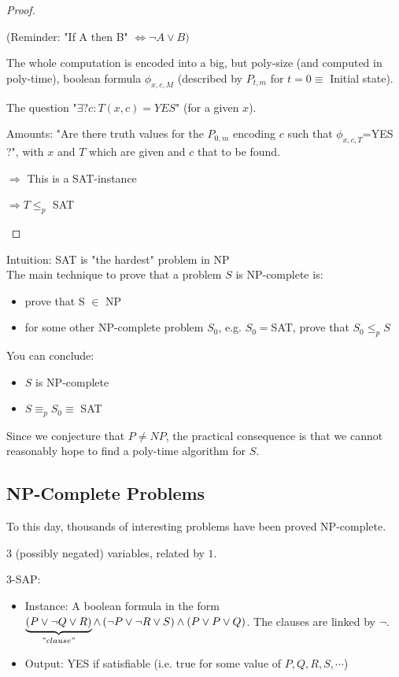 \begin{proof}
\begin{itemize}
(Reminder: "If A then B" $\Leftrightarrow \neg A \vee B)$ 

The whole computation is encoded into a big, but poly-size (and computed in poly-time), boolean formula $\phi_{x,c,M}$ (described by $P_{t,m}$ for $t=0\equiv$ Initial state). 

The question "$\exists ? c: T(x,c)=YES$" (for a given $x$). 

Amounts: "Are there truth values for the $P_{0,m}$ encoding $c$ such that $\phi_{x,c,T}$=YES ?", with $x$ and $T$ which are given and $c$ that to be found. 

$\Rightarrow$ This is a SAT-instance 

$\Rightarrow T \leq_{p} $ SAT
\end{itemize} 
\end{proof}

Intuition: SAT is "the hardest" problem in NP \\
The main technique to prove that a problem $S$ is NP-complete is:
\begin{itemize}
\item prove that S $\in$ NP
\item for some other NP-complete problem $S_0$, e.g. $S_0=$SAT, prove that $S_0 \leq_p S$
\end{itemize}
You can conclude:
\begin{itemize}
\item $S$ is NP-complete
\item $S \equiv_p S_0 \equiv$ SAT
\end{itemize}
Since we conjecture that $P\neq NP$, the practical consequence is that we cannot reasonably hope to find a poly-time algorithm for $S$. 
 
\subsection{NP-Complete Problems}

To this day, thousands of interesting problems have been proved NP-complete.

\begin{example}
\begin{leftbar}
$3$ (possibly negated) variables, related by $1$.
\begin{definition}
3-SAP:
\begin{itemize}
\item Instance: A boolean formula in the form $\underbrace{\left( P \vee \neg Q \vee R \right)}_{"clause"} \wedge \left( \neg P \vee \neg R \vee S \right) \wedge \left( P \vee P  \vee Q \right)$. The clauses are linked by $\neg$.
\item Output: YES if satisfiable (i.e. true for some value of $P,Q,R,S,\cdots$) 
\end{itemize}
\end{definition}
\end{leftbar}
\end{example}

